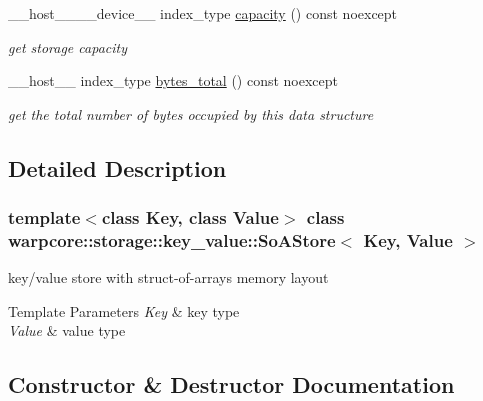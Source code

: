 \begin{DoxyCompactItemize}
\+\_\+\+\_\+host\+\_\+\+\_\+\+\_\+\+\_\+device\+\_\+\+\_\+ index\+\_\+type \hyperlink{classwarpcore_1_1storage_1_1key__value_1_1SoAStore_a2ae1c90988d891741861e6e6d571ec00}{capacity} () const noexcept
\begin{DoxyCompactList}\small\item\em get storage capacity \end{DoxyCompactList}\item 
\+\_\+\+\_\+host\+\_\+\+\_\+ index\+\_\+type \hyperlink{classwarpcore_1_1storage_1_1key__value_1_1SoAStore_ae0dcf0801cbe4d994f9bb385e51d02b7}{bytes\+\_\+total} () const noexcept
\begin{DoxyCompactList}\small\item\em get the total number of bytes occupied by this data structure \end{DoxyCompactList}\end{DoxyCompactItemize}


\subsection{Detailed Description}
\subsubsection*{template$<$class Key, class Value$>$\newline
class warpcore\+::storage\+::key\+\_\+value\+::\+So\+A\+Store$<$ Key, Value $>$}

key/value store with struct-\/of-\/arrays memory layout 


\begin{DoxyTemplParams}{Template Parameters}
{\em Key} & key type \\
\hline
{\em Value} & value type \\
\hline
\end{DoxyTemplParams}


\subsection{Constructor \& Destructor Documentation}
\mbox{\label{classwarpcore_1_1storage_1_1key__value_1_1SoAStore_a4dc140aa67de81f7bdff2bc16f6a1b8b}} 
